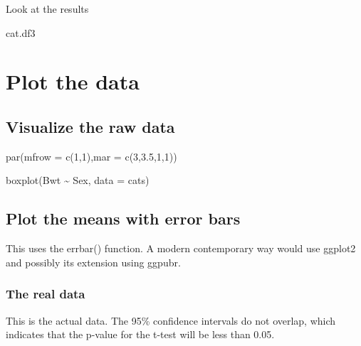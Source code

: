 \documentclass[
]{book}
\newenvironment{Shaded}{\begin{snugshade}}{\end{snugshade}}
\newcommand{\AttributeTok}[1]{\textcolor[rgb]{0.77,0.63,0.00}{#1}}
\newcommand{\DecValTok}[1]{\textcolor[rgb]{0.00,0.00,0.81}{#1}}
\newcommand{\FloatTok}[1]{\textcolor[rgb]{0.00,0.00,0.81}{#1}}
\newcommand{\FunctionTok}[1]{\textcolor[rgb]{0.00,0.00,0.00}{#1}}
\newcommand{\NormalTok}[1]{#1}
\newcommand{\SpecialCharTok}[1]{\textcolor[rgb]{0.00,0.00,0.00}{#1}}
\begin{document}
Look at the results

\begin{Shaded}
\begin{Highlighting}[]
\NormalTok{cat.df3}
\end{Highlighting}
\end{Shaded}

\hypertarget{plot-the-data}{%
\section{Plot the data}\label{plot-the-data}}

\hypertarget{visualize-the-raw-data}{%
\subsection{Visualize the raw data}\label{visualize-the-raw-data}}

\begin{Shaded}
\begin{Highlighting}[]
\FunctionTok{par}\NormalTok{(}\AttributeTok{mfrow =} \FunctionTok{c}\NormalTok{(}\DecValTok{1}\NormalTok{,}\DecValTok{1}\NormalTok{),}\AttributeTok{mar =} \FunctionTok{c}\NormalTok{(}\DecValTok{3}\NormalTok{,}\FloatTok{3.5}\NormalTok{,}\DecValTok{1}\NormalTok{,}\DecValTok{1}\NormalTok{))}

\FunctionTok{boxplot}\NormalTok{(Bwt }\SpecialCharTok{\textasciitilde{}}\NormalTok{ Sex, }\AttributeTok{data =}\NormalTok{ cats)}
\end{Highlighting}
\end{Shaded}

\hypertarget{plot-the-means-with-error-bars}{%
\subsection{Plot the means with error bars}\label{plot-the-means-with-error-bars}}

This uses the errbar() function. A modern contemporary way would use ggplot2 and possibly its extension using ggpubr.

\hypertarget{the-real-data}{%
\subsubsection{The real data}\label{the-real-data}}

This is the actual data. The 95\% confidence intervals do not overlap, which indicates that the p-value for the t-test will be less than 0.05.
\end{document}

